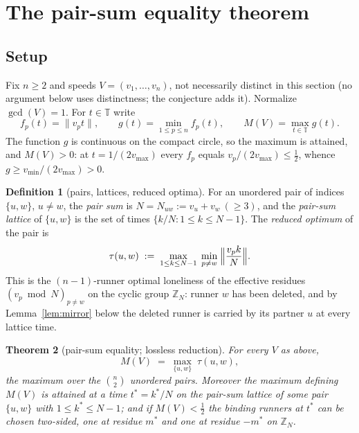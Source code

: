\documentclass[11pt,a4paper]{article}
\numberwithin{equation}{section}
\theoremstyle{plain}
\newtheorem{theorem}{Theorem}[section]
\theoremstyle{definition}
\newtheorem{definition}[theorem]{Definition}
\theoremstyle{remark}
\newcommand{\Z}{\mathbb{Z}}
\newcommand{\T}{\mathbb{T}}
\newcommand{\wnc}[1]{\lVert #1 \rVert}
\begin{document}

\section{The pair-sum equality theorem}\label{sec:equality}

\subsection{Setup}

Fix $n\ge 2$ and speeds $V=(v_1,\dots,v_n)$, not necessarily distinct in
this section (no argument below uses distinctness; the conjecture adds it).
Normalize $\gcd(V)=1$. For $t\in\T$ write
\[
f_p(t)=\wnc{v_p t},\qquad
g(t)=\min_{1\le p\le n} f_p(t),\qquad
M(V)=\max_{t\in\T} g(t).
\]
The function $g$ is continuous on the compact circle, so the maximum is
attained, and $M(V)>0$: at $t=1/(2v_{\max})$ every $f_p$ equals
$v_p/(2v_{\max})\le \tfrac12$, whence $g\ge v_{\min}/(2v_{\max})>0$.

\begin{definition}[pairs, lattices, reduced optima]\label{def:pair}
For an unordered pair of indices $\{u,w\}$, $u\ne w$, the \emph{pair sum}
is $N=N_{uw}:=v_u+v_w\ (\ge 3)$, and the \emph{pair-sum lattice} of
$\{u,w\}$ is the set of times $\{k/N : 1\le k\le N-1\}$. The
\emph{reduced optimum} of the pair is
\[
\tau(u,w)\;:=\;\max_{1\le k\le N-1}\;
\min_{p\ne w}\;\Bigl\lVert \frac{v_p k}{N}\Bigr\rVert .
\]
This is the $(n{-}1)$-runner optimal loneliness of the effective residues
$(v_p\bmod N)_{p\ne w}$ on the cyclic group $\Z_N$: runner $w$ has been
deleted, and by Lemma~\ref{lem:mirror} below the deleted runner is carried
by its partner $u$ at every lattice time.
\end{definition}

\begin{theorem}[pair-sum equality; lossless reduction]\label{thm:equality}
For every $V$ as above,
\[
M(V)\;=\;\max_{\{u,w\}}\;\tau(u,w),
\]
the maximum over the $\binom{n}{2}$ unordered pairs. Moreover the maximum
defining $M(V)$ is attained at a time $t^\ast=k^\ast/N$ on the pair-sum
lattice of some pair $\{u,w\}$ with $1\le k^\ast\le N-1$; and if
$M(V)<\tfrac12$ the binding runners at $t^\ast$ can be chosen two-sided,
one at residue $m^\ast$ and one at residue $-m^\ast$ on $\Z_N$.
\end{theorem}
\end{document}
